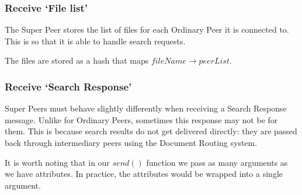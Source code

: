 \subsubsection{Receive `File list'}

The Super Peer stores the list of files for each Ordinary Peer it is connected
to. This is so that it is able to handle search requests.

The files are stored as a hash that maps $fileName \rightarrow peerList$.

\begin{algorithm}[H]

\end{algorithm}

\subsubsection{Receive `Search Response'}

Super Peers must behave slightly differently when receiving a Search Response
message. Unlike for Ordinary Peers, sometimes this response may not be for them.
This is because search results do not get delivered directly: they are passed
back through intermediary peers using the Document Routing system.

It is worth noting that in our $send()$ function we pass as many arguments as we
have attributes. In practice, the attributes would be wrapped into a single
argument.

\begin{algorithm}[H]

\end{algorithm}

